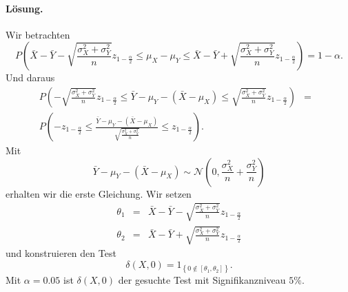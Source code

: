 \paragraph*{Lösung.} Wir betrachten
\begin{equation*}
    P\left( \bar X - \bar Y - \sqrt{ \frac{\sigma^2_X + \sigma^2_Y}{n}  }z_{1-\frac{\alpha}{2}} \leq \mu_X - \mu_Y \leq \bar X - \bar Y + \sqrt{ \frac{\sigma^2_X + \sigma^2_Y}{n}  }z_{1-\frac{\alpha}{2}}   \right) = 1-\alpha.
\end{equation*}
Und daraus
\begin{eqnarray*}
    P \left(  - \sqrt{ \frac{\sigma^2_X + \sigma^2_Y}{n}  }z_{1-\frac{\alpha}{2}} \leq
    \bar Y -\mu_Y -\left( \bar X - \mu_X \right) \leq 
    \sqrt{ \frac{\sigma^2_X + \sigma^2_Y}{n}  }z_{1-\frac{\alpha}{2}}
    \right) &=& \\ 
    P \left(  - z_{1-\frac{\alpha}{2}} \leq
    \frac{ \bar Y -\mu_Y -\left( \bar X - \mu_X \right)  }{  \sqrt{ \frac{\sigma^2_X + \sigma^2_Y}{n}  } } 
    \leq  z_{1-\frac{\alpha}{2}} 
    \right).
\end{eqnarray*}
Mit
\begin{equation*}
    \bar Y - \mu_Y - \left( \bar X - \mu_X \right) \sim 
    \mathcal N\left(0, \frac{\sigma^2_X}{n} + \frac{\sigma^2_Y}{n}   \right)
\end{equation*}
erhalten wir die erste Gleichung.  
Wir setzen
\begin{eqnarray*}
    \theta_1 &=& \bar X - \bar Y - \sqrt{ \frac{\sigma^2_X + \sigma^2_Y}{n}  }z_{1-\frac{\alpha}{2}} \\
    \theta_2 &=& \bar X - \bar Y + \sqrt{ \frac{\sigma^2_X + \sigma^2_Y}{n}  }z_{1-\frac{\alpha}{2}} 
\end{eqnarray*}
und konstruieren den Test
\begin{equation*}
    \delta\left( X,0 \right) = 1_{ \left\{ 0 \nin \left[ \theta_1,\theta_2 \right] \right\} }.
\end{equation*}
Mit $\alpha=0.05$ ist $\delta(X,0)$ der gesuchte Test mit Signifikanzniveau $5\%$.

